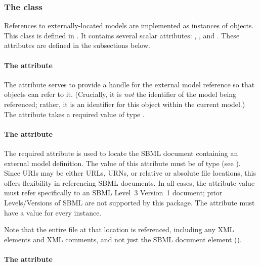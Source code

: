 \subsubsection{The  class}
\label{externalmodeldefinition-class}

References to externally-located models are implemented as instances of
\ExternalModelDefinition objects.  This class is defined in
.  It contains several scalar attributes:
, ,  and .  These
attributes are defined in the subsections below.


\paragraph{The \hspace*{1pt} attribute}

The  attribute serves to provide a handle for the external
model reference so that \Submodel objects can refer to it.  (Crucially,
it is \emph{not} the identifier of the model being referenced; rather,
it is an identifier for this \ExternalModelDefinition object within the
current model.)  The  attribute takes a required value of type
.


\paragraph{The \hspace*{1pt} attribute}

The required attribute  is used to locate the SBML
document containing an external model definition.  The value of this
attribute must be of type  (see ).
Since URIs may be either URLs, URNs, or relative or absolute file
locations, this offers flexibility in referencing SBML documents.  In
all cases, the  attribute value must refer specifically to
an SBML Level~3 Version~1 document; prior Levels/Versions of SBML are
not supported by this package.  The  attribute must have a
value for every \ExternalModelDefinition instance.

Note that the entire file at that location is referenced, including any
XML elements and XML comments, and not just the SBML document element
().  


\paragraph{The \hspace*{1pt} attribute}

